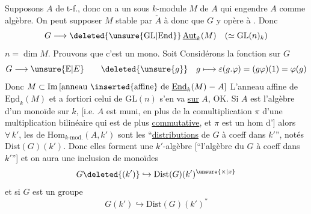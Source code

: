 Supposons  $A$ de t-f., donc on a un sous $k$-module  $M$ de $A$ qui engendre $A$ comme algèbre.  On peut supposer $M$ stable par $\check A$ à    donc que $G$ y opère à  . Donc
\[
 G\longrightarrow\deleted{\unsure{\mathrm{GL}|{\mathrm{End}}}}\,\underline{\mathrm{Aut}}_{k}(M)\quad(\simeq\mathrm{GL}(n)_{k})
\]
 $n=\dim M$. Prouvons que c'est un mono.  Soit  Considérons  la fonction sur $G$
\[
 G\longrightarrow\unsure{\mathbb E|E}\qquad \deleted{\unsure{g}}\quad
 g\longmapsto\varepsilon(g.\varphi)=(g\varphi)(1)=\varphi(g)
\]
 Donc  $M\subset\mathrm{Im}\,[\text{anneau }\inserted{\text{affine}}\text{ de }\underline{\mathrm{End}}_k(M)\mathrel{-}A]$  L'anneau affine de $\underline{\mathrm{End}}_k(M)$ et a fortiori celui de $\mathrm{GL}(n)$ s'en va \uline{sur} $A$, OK.
Si $A$ est l'algèbre  d'un monoïde  sur $k$, [i.e. $A$ est muni, en plus de la comultiplication $\pi$  d'une multiplication bilinéaire   qui est de plus \uline{commutative}, et $\pi$ est un
hom d'] alors $\forall\,k'$, les  de  $\mathrm{Hom}_{k\text{-mod.}}(A,k')$  sont  les ``\uline{distributions} de $G$ à  coeff dans $k'$'', notés $\mathrm{Dist}(G)(k')$. Donc  elles forment une $k'$-algèbre [``l'algèbre du    $G$ à coeff dans $k'$''] et on aura une inclusion de monoïdes
\[
 G\deleted{(k')}\hookrightarrow\mathrm{Dist}(G)(k')^{\unsure{\times|x}}
\]
et si $G$ est un groupe
\[
 G(k')\hookrightarrow\mathrm{Dist}(G)(k')^{*}
\]


